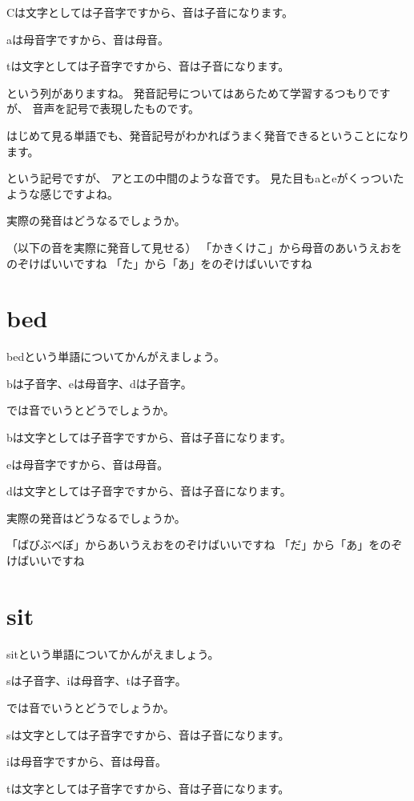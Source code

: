 \documentclass[book,jafontscale=0.9247]{jlreq}
\let\textipa\relax
\begin{document}
Cは文字としては子音字ですから、音は子音になります。

aは母音字ですから、音は母音。

tは文字としては子音字ですから、音は子音になります。

という列がありますね。
発音記号についてはあらためて学習するつもりですが、
音声を記号で表現したものです。

はじめて見る単語でも、発音記号がわかればうまく発音できるということになります。

\textipa{/\ae /}という記号ですが、
アとエの中間のような音です。
見た目もaとeがくっついたような感じですよね。


実際の発音はどうなるでしょうか。

（以下の音を実際に発音して見せる）
\textipa{/k/} 「かきくけこ」から母音のあいうえおをのぞけばいいですね
\textipa{/\ae /}
\textipa{/t/} 「た」から「あ」をのぞけばいいですね

\section{bed}

bedという単語についてかんがえましょう。

bは子音字、eは母音字、dは子音字。

では音でいうとどうでしょうか。

bは文字としては子音字ですから、音は子音になります。

eは母音字ですから、音は母音。

dは文字としては子音字ですから、音は子音になります。

実際の発音はどうなるでしょうか。

\textipa{/b/}「ばびぶべぼ」からあいうえおをのぞけばいいですね
\textipa{/e/}
\textipa{/d/}「だ」から「あ」をのぞけばいいですね

\section{sit}

sitという単語についてかんがえましょう。

sは子音字、iは母音字、tは子音字。

では音でいうとどうでしょうか。

sは文字としては子音字ですから、音は子音になります。

iは母音字ですから、音は母音。

tは文字としては子音字ですから、音は子音になります。
\end{document}
